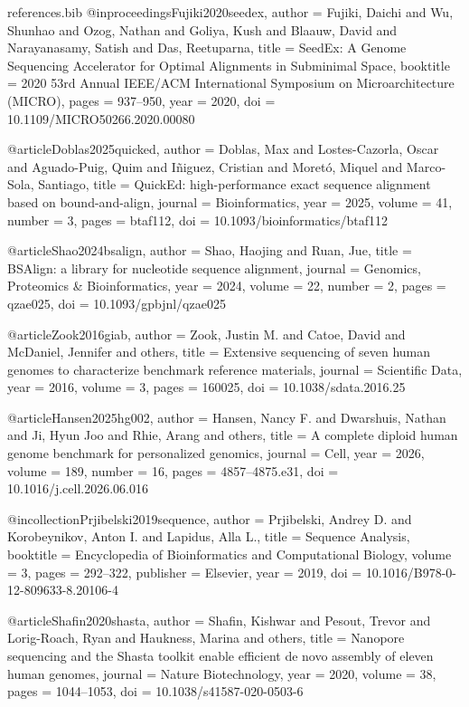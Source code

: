\begin{filecontents*}[overwrite]{references.bib}
@inproceedings{Fujiki2020seedex,
  author    = {Fujiki, Daichi and Wu, Shunhao and Ozog, Nathan and Goliya, Kush and Blaauw, David and Narayanasamy, Satish and Das, Reetuparna},
  title     = {{SeedEx}: A Genome Sequencing Accelerator for Optimal Alignments in Subminimal Space},
  booktitle = {2020 53rd Annual IEEE/ACM International Symposium on Microarchitecture (MICRO)},
  pages     = {937--950},
  year      = {2020},
  doi       = {10.1109/MICRO50266.2020.00080}
}

@article{Doblas2025quicked,
  author  = {Doblas, Max and Lostes-Cazorla, Oscar and Aguado-Puig, Quim and I{\~n}iguez, Cristian and Moret{\'o}, Miquel and Marco-Sola, Santiago},
  title   = {{QuickEd}: high-performance exact sequence alignment based on bound-and-align},
  journal = {Bioinformatics},
  year    = {2025},
  volume  = {41},
  number  = {3},
  pages   = {btaf112},
  doi     = {10.1093/bioinformatics/btaf112}
}

@article{Shao2024bsalign,
  author  = {Shao, Haojing and Ruan, Jue},
  title   = {{BSAlign}: a library for nucleotide sequence alignment},
  journal = {Genomics, Proteomics \& Bioinformatics},
  year    = {2024},
  volume  = {22},
  number  = {2},
  pages   = {qzae025},
  doi     = {10.1093/gpbjnl/qzae025}
}

@article{Zook2016giab,
  author  = {Zook, Justin M. and Catoe, David and McDaniel, Jennifer and others},
  title   = {Extensive sequencing of seven human genomes to characterize benchmark reference materials},
  journal = {Scientific Data},
  year    = {2016},
  volume  = {3},
  pages   = {160025},
  doi     = {10.1038/sdata.2016.25}
}

@article{Hansen2025hg002,
  author  = {Hansen, Nancy F. and Dwarshuis, Nathan and Ji, Hyun Joo and Rhie, Arang and others},
  title   = {A complete diploid human genome benchmark for personalized genomics},
  journal = {Cell},
  year    = {2026},
  volume  = {189},
  number  = {16},
  pages   = {4857--4875.e31},
  doi     = {10.1016/j.cell.2026.06.016}
}

@incollection{Prjibelski2019sequence,
  author    = {Prjibelski, Andrey D. and Korobeynikov, Anton I. and Lapidus, Alla L.},
  title     = {Sequence Analysis},
  booktitle = {Encyclopedia of Bioinformatics and Computational Biology},
  volume    = {3},
  pages     = {292--322},
  publisher = {Elsevier},
  year      = {2019},
  doi       = {10.1016/B978-0-12-809633-8.20106-4}
}

@article{Shafin2020shasta,
  author  = {Shafin, Kishwar and Pesout, Trevor and Lorig-Roach, Ryan and Haukness, Marina and others},
  title   = {Nanopore sequencing and the {Shasta} toolkit enable efficient de novo assembly of eleven human genomes},
  journal = {Nature Biotechnology},
  year    = {2020},
  volume  = {38},
  pages   = {1044--1053},
  doi     = {10.1038/s41587-020-0503-6}
}


\end{filecontents*}
